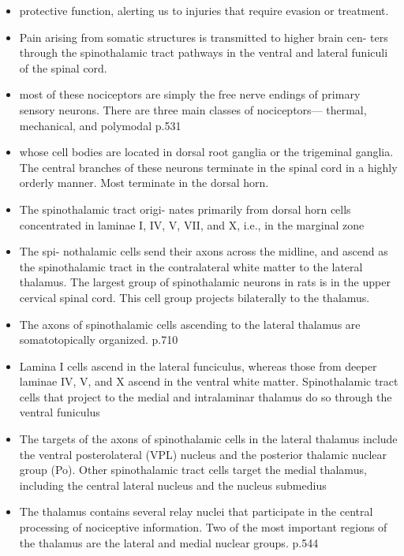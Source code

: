 \documentclass[12pt,a4paper,pdftex]{article}
\begin{document}
\begin{itemize}
    \item protective function, alerting us to injuries that require evasion or treatment. \cite{kandel2013principles}
    \item Pain arising from
    somatic structures is transmitted to higher brain cen-
    ters through the spinothalamic tract pathways in the
    ventral and lateral funiculi of the spinal cord. \cite{paxinos2014rat}
    \item most of these nociceptors
    are simply the free nerve endings of primary sensory
    neurons. There are three main classes of nociceptors—
    thermal, mechanical, and polymodal \cite{kandel2013principles} p.531
    \item whose cell bodies are located in dorsal root
    ganglia or the trigeminal ganglia. The central branches
    of these neurons terminate in the spinal cord in a highly
    orderly manner. Most terminate in the dorsal horn. \cite{kandel2013principles}
    \item The spinothalamic tract origi-
    nates primarily from dorsal horn cells concentrated in
    laminae I, IV, V, VII, and X, i.e., in the marginal zone \cite{paxinos2014rat}
    \item The spi-
    nothalamic cells send their axons across the midline, and
    ascend as the spinothalamic tract in the contralateral white matter to the lateral thalamus. The largest group of spinothalamic neurons in rats is in the upper cervical spinal cord. This cell group projects bilaterally to the thalamus. \cite{paxinos2014rat}
    \item The axons of spinothalamic cells ascending to the lateral thalamus are somatotopically organized. \cite{paxinos2014rat} p.710
    \item Lamina I cells ascend in the lateral funciculus, whereas those from deeper laminae IV, V, and X ascend in the ventral white matter. Spinothalamic tract cells that project to the medial and intralaminar thalamus do so through the
    ventral funiculus
    \item The targets of the axons of spinothalamic cells in the lateral thalamus include the ventral posterolateral (VPL) nucleus and the posterior thalamic nuclear group (Po). Other spinothalamic tract cells target the medial thalamus, including the central lateral nucleus and the nucleus submedius \cite{paxinos2014rat}
    \item The thalamus contains several relay nuclei that participate in the central processing of nociceptive information. Two of the most important regions of the thalamus are the lateral and medial nuclear groups. \cite{kandel2013principles} p.544

\end{itemize}
\end{document}

